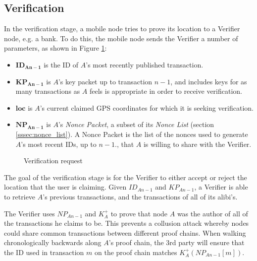 \documentclass[12pt]{article}
\begin{document}
\subsection{Verification} \label{ssec:verification}
\begin{minipage}{0.5\linewidth}
In the verification stage, a mobile node tries to prove its location to a Verifier node, e.g. a bank. To do this, the mobile node sends the Verifier a number of parameters, as shown in Figure \ref{fig:verify_request}:
\begin{itemize}[noitemsep,topsep=0pt]
	\item[] $\mathbf{ID_{An-1}}$ is the ID of $A$'s most recently published transaction.
	\item[] $\mathbf{KP_{An-1}}$ is $A$'s key packet up to transaction $n-1$, and includes keys for as many transactions as $A$ feels is appropriate in order to receive verification.
	\item[] $\mathbf{loc}$ is $A$'s current claimed GPS coordinates for which it is seeking verification.
	\item[] $\mathbf{NP_{An-1}}$ is $A$'s \textit{Nonce Packet}, a subset of its \textit{Nonce List} (section \ref{sssec:nonce_list}). A Nonce Packet is the list of the nonces used to generate $A$'s most recent IDs, up to $n-1$., that $A$ is willing to share with the Verifier. 
\end{itemize}
\end{minipage}
\hfill
\begin{minipage}[c]{0.5\linewidth}
\begin{figure}[H]

\caption{Verification request}
\label{fig:verify_request}
\end{figure}
\end{minipage}


The goal of the verification stage is for the Verifier to either accept or reject the location that the user is claiming. Given $ID_{An-1}$ and $KP_{An-1}$, a Verifier is able to retrieve $A$'s previous transactions, and the transactions of all of its alibi's.

The Verifier uses $NP_{An-1}$ and $K^{+}_A$ to prove that node $A$ was the author of all of the transactions he claims to be. This prevents a collusion attack whereby nodes could share common transactions between different proof chains. When walking chronologically backwards along $A$'s proof chain, the 3rd party will ensure that the ID used in transaction $m$ on the proof chain matches $K^{+}_A(NP_{An-1}[m])$.
\end{document}
